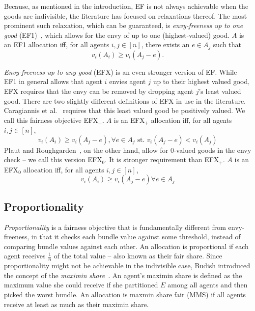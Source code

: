 Because, as mentioned in the introduction, EF is not always achievable when the goods are indivisible, the literature has focused on relaxations thereof. The most prominent such relaxation, which can be guaranteed, is \textit{envy-freeness up to one good} (EF1)~\cite{lipton-2004}, which allows for the envy of up to one (highest-valued) good. $A$ is an EF1 allocation iff, for all agents $i,j \in [n]$, there exists an $e \in A_j$ such that
\begin{equation} \tag{EF1}
  v_i(A_i) \geq v_i(A_j - e).
\end{equation}

\textit{Envy-freeness up to any good} (EFX) is an even stronger version of EF. While EF1 in general allows that agent $i$ envies agent $j$ up to their highest valued good, EFX requires that the envy can be removed by dropping agent $j$'s least valued good. There are two slightly different definitions of EFX in use in the literature. Caragiannis et al.~\cite{caragiannis-Unreasonable} requires that this least valued good be positively valued. We call this fairness objective EFX$_+$. $A$ is an EFX$_+$ allocation iff, for all agents $i,j \in [n]$,
\begin{equation} \tag{EFX$_+$}
  v_i(A_i) \geq v_i(A_j - e), \forall e \in A_j \text{ st. } v_i(A_j-e) < v_i(A_j)
\end{equation}
Plaut and Roughgarden~\cite{plaut2017envyfreeness}, on the other hand, allow for 0-valued goods in the envy check -- we call this version EFX$_0$. It is stronger requirement than EFX$_+$. $A$ is an EFX$_0$ allocation iff, for all agents $i,j \in [n]$,
\begin{equation} \tag{EFX$_0$}
  v_i(A_i) \geq v_i(A_j - e) \forall e \in A_j
\end{equation}

\subsection{Proportionality}
\textit{Proportionality} is a fairness objective that is fundamentally different from envy-freeness, in that it checks each bundle value against some threshold, instead of comparing bundle values against each other. An allocation is proportional if each agent receives $\frac{1}{n}$ of the total value -- also known as their fair share. Since proportionality might not be achievable in the indivisible case, Budish introduced the concept of the \textit{maximin share}~\cite{Budish2011}. An agent's maximin share is defined as the maximum value she could receive if she partitioned $E$ among all agents and then picked the worst bundle. An allocation is maxmin share fair (MMS) if all agents receive at least as much as their maximin share.






